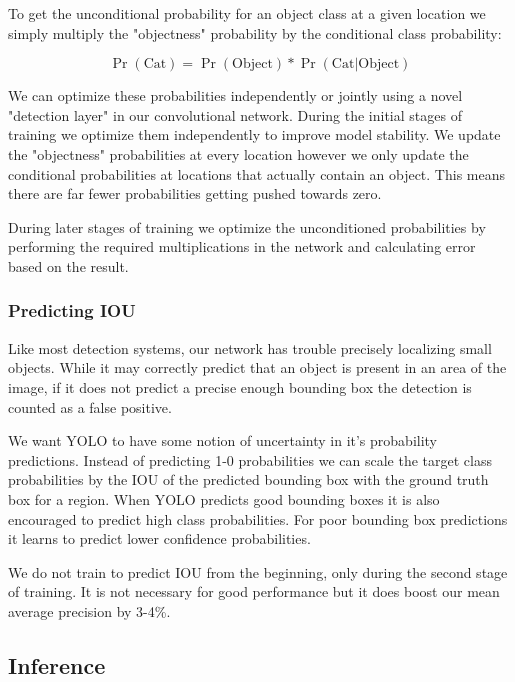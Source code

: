\documentclass{article} %
\begin{document}
To get the unconditional probability for an object class at a given location we simply multiply the "objectness" probability by the conditional class probability:

\begin{equation}
\Pr(\textrm{Cat}) = \Pr(\textrm{Object}) * \Pr(\textrm{Cat} | \textrm{Object})
\end{equation}

We can optimize these probabilities independently or jointly using a novel "detection layer" in our convolutional network. During the initial stages of training we optimize them independently to improve model stability. We update the "objectness" probabilities at every location however we only update the conditional probabilities at locations that actually contain an object. This means there are far fewer probabilities getting pushed towards zero. 

During later stages of training we optimize the unconditioned probabilities by performing the required multiplications in the network and calculating error based on the result.

\subsubsection{Predicting IOU}

Like most detection systems, our network has trouble precisely localizing small objects. While it may correctly predict that an object is present in an area of the image, if it does not predict a precise enough bounding box the detection is counted as a false positive.

We want YOLO to have some notion of uncertainty in it's probability predictions. Instead of predicting 1-0 probabilities we can scale the target class probabilities by the IOU of the predicted bounding box with the ground truth box for a region. When YOLO predicts good bounding boxes it is also encouraged to predict high class probabilities. For poor bounding box predictions it learns to predict lower confidence probabilities.

We do not train to predict IOU from the beginning, only during the second stage of training. It is not necessary for good performance but it does boost our mean average precision by 3-4\%.

\subsection{Inference}
\end{document}

